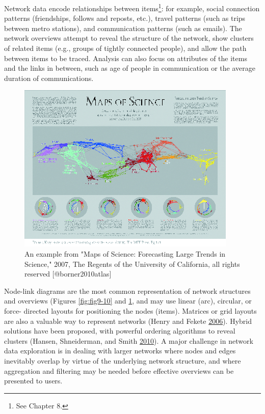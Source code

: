 \documentclass[]{krantz}
\begin{document}
Network data encode relationships between items\footnote{See Chapter 8.}:
for example, social connection patterns (friendships, follows and
reposts, etc.), travel patterns (such as trips between metro stations),
and communication patterns (such as emails). The network overviews
attempt to reveal the structure of the network, show clusters of related
items (e.g., groups of tightly connected people), and allow the path
between items to be traced. Analysis can also focus on attributes of the
items and the links in between, such as age of people in communication
or the average duration of communications.

\begin{figure}

{\centering \includegraphics[width=0.7\linewidth]{ChapterViz/figures/fig9-10b} 

}

\caption{An example from "Maps of Science: Forecasting Large Trends in Science," 2007, The Regents of the University of California, all rights reserved [@borner2010atlas]}\label{fig:fig9-10b}
\end{figure}

{Node-link diagrams} are the most common representation of network
structures and overviews (Figures \ref{fig:fig9-10} and
\ref{fig:fig9-10b}, and may use linear (arc), circular, or force-
directed layouts for positioning the nodes (items). Matrices or grid
layouts are also a valuable way to represent networks (Henry and Fekete
\protect\hyperlink{ref-henry2006matrixexplorer}{2006}). Hybrid solutions
have been proposed, with powerful ordering algorithms to reveal clusters
(Hansen, Shneiderman, and Smith
\protect\hyperlink{ref-hansen2010analyzing}{2010}). A major challenge in
network data exploration is in dealing with larger networks where nodes
and edges inevitably overlap by virtue of the underlying network
structure, and where aggregation and filtering may be needed before
effective overviews can be presented to users.
\end{document}
